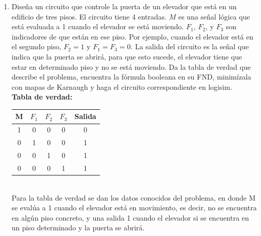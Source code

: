 \documentclass[12pt]{article} %
\begin{document}
\begin{enumerate}
        \item Diseña un circuito que controle la puerta de un elevador que
            está en un edificio de tres pisos. El circuito tiene 4 entradas. 
            $M$ es una señal lógica que está evaluada a 1 cuando el elevador se
            está moviendo. $F_1$, $F_2$, y $F_3$ son indicadores de que están 
            en ese piso. Por ejemplo, cuando el elevador está en el segundo
            piso, $F_2 = 1$ y $F_1 = F_3 = 0$.
            La salida del circuito es la señal que indica que la puerta se 
            abrirá, para que esto sucede, el elevador tiene que estar en 
            determinado piso y no se está moviendo. Da la tabla de verdad que
            describe el problema, encuentra la fórmula booleana en su FND, 
            minimízala con mapas de Karnaugh y haga el circuito correspondiente
            en logisim. 
            \\

            \textbf{Tabla de verdad:}
            \begin{table}[h!]
                \centering
                \begin{tabular}{|c|c|c|c|c|}
                    \hline
                    M & $F_1$ & $F_2$ & $F_3$ & Salida\\
                    \hline
                    1 & 0 & 0 & 0 & 0\\
                    \hline
                    0 & 1 & 0 & 0 & 1\\
                    \hline
                    0 & 0 & 1 & 0 & 1\\
                    \hline
                    0 & 0 & 0 & 1 & 1\\
                    \hline
                \end{tabular}
            \end{table}
        \\
        Para la tabla de verdad se dan los datos conocidos del problema, 
        en donde M se evalúa a 1 cuando el elevador está en movimiento, 
        es decir, no se encuentra en algún piso concreto, y una salida 1 
        cuando el elevador si se encuentra en un piso determinado y la puerta se abrirá.
        \\


\end{enumerate}
\end{document}
